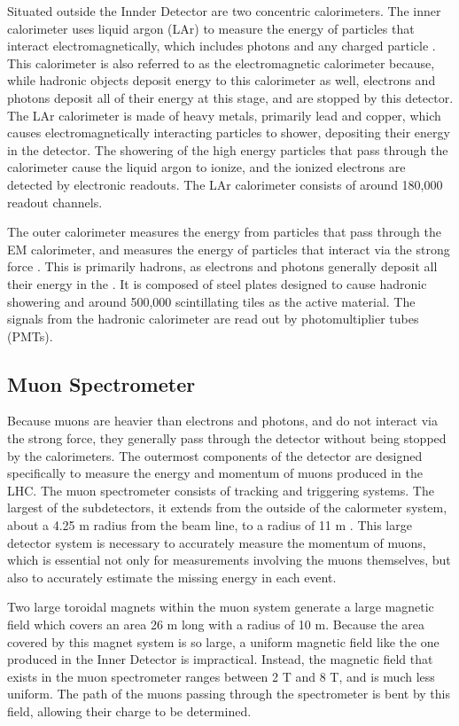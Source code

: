 Situated outside the Innder Detector are two concentric calorimeters. The inner calorimeter uses liquid argon (LAr) to measure the  energy of particles that interact electromagnetically, which includes photons and any charged particle \cite{LARG-2009-01}. This calorimeter is also referred to as the electromagnetic calorimeter because, while hadronic objects deposit energy to this calorimeter as well, electrons and photons deposit all of their energy at this stage, and are stopped by this detector. The LAr calorimeter is made of heavy metals, primarily lead and copper, which causes electromagnetically interacting particles to shower, depositing their energy in the detector. The showering of the high energy particles that pass through the calorimeter cause the liquid argon to ionize, and the ionized electrons are detected by electronic readouts. The LAr calorimeter consists of around 180,000 readout channels.  

The outer calorimeter measures the energy from particles that pass through the EM calorimeter, and measures the energy of particles that interact via the strong force \cite{TCAL-2010-01}. This is primarily hadrons, as electrons and photons generally deposit all their energy in the . It is composed of steel plates designed to cause hadronic showering and around 500,000 scintillating tiles as the active material. The signals from the hadronic calorimeter are read out by photomultiplier tubes (PMTs).

\subsection{Muon Spectrometer}
\label{sec:muonSpec}

Because muons are heavier than electrons and photons, and do not interact via the strong force, they generally pass through the detector without being stopped by the calorimeters. The outermost components of the detector are designed specifically to measure the energy and momentum of muons produced in the LHC. The muon spectrometer consists of tracking and triggering systems. The largest of the subdetectors, it extends from the outside of the calormeter system, about a 4.25 m radius from the beam line, to a radius of 11 m \cite{MUON-2010-01}. This large detector system is necessary to accurately measure the momentum of muons, which is essential not only for measurements involving the muons themselves, but also to accurately estimate the missing energy in each event.

Two large toroidal magnets within the muon system generate a large magnetic field which covers an area 26 m long with a radius of 10 m. Because the area covered by this magnet system is so large, a uniform magnetic field like the one produced in the Inner Detector is impractical. Instead, the magnetic field that exists in the muon spectrometer ranges between 2 T and 8 T, and is much less uniform. The path of the muons passing through the spectrometer is bent by this field, allowing their charge to be determined. 


